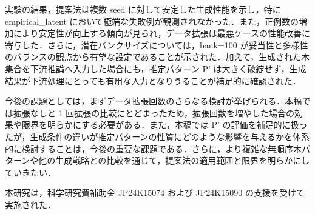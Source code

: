 \documentclass[submit,techrep,noauthor]{ipsj}
\begin{document}
実験の結果，提案法は複数 seed に対して安定した生成性能を示し，特に empirical\_latent において極端な失敗例が観測されなかった．また，正例数の増加により安定性が向上する傾向が見られ，データ拡張は最悪ケースの性能改善に寄与した．さらに，潜在バンクサイズについては，bank=100 が妥当性と多様性のバランスの観点から有望な設定であることが示された．加えて，生成された木集合を下流推論へ入力した場合にも，推定パターン P' は大きく破綻せず，生成結果が下流処理にとっても有用な入力となりうることが補足的に確認された．

今後の課題としては，まずデータ拡張回数のさらなる検討が挙げられる．本稿では拡張なしと 1 回拡張の比較にとどまったため，拡張回数を増やした場合の効果や限界を明らかにする必要がある．また，本稿では P' の評価を補足的に扱ったが，生成条件の違いが推定パターンの性質にどのような影響を与えるかを体系的に検討することは，今後の重要な課題である．さらに，より複雑な無順序木パターンや他の生成戦略との比較を通じて，提案法の適用範囲と限界を明らかにしていきたい．

\begin{acknowledgment}
本研究は，科学研究費補助金 JP24K15074 および JP24K15090 の支援を受けて実施された．
\end{acknowledgment}
\end{document}
